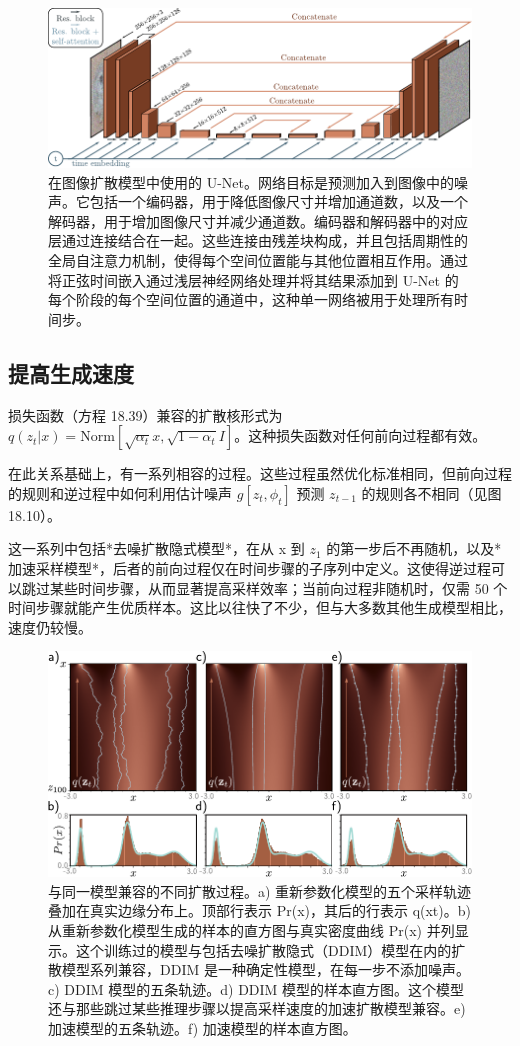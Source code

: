 \documentclass[lang=cn,newtx,10pt,scheme=chinese]{elegantbook}
\begin{document}
\begin{figure}[ht!]
\centering
\includegraphics[width=0.7\linewidth]{PDFFigures/UDLChap18PDF/DiffusionUNet.pdf}
\caption{在图像扩散模型中使用的 U-Net。网络目标是预测加入到图像中的噪声。它包括一个编码器，用于降低图像尺寸并增加通道数，以及一个解码器，用于增加图像尺寸并减少通道数。编码器和解码器中的对应层通过连接结合在一起。这些连接由残差块构成，并且包括周期性的全局自注意力机制，使得每个空间位置能与其他位置相互作用。通过将正弦时间嵌入通过浅层神经网络处理并将其结果添加到 U-Net 的每个阶段的每个空间位置的通道中，这种单一网络被用于处理所有时间步。}
\end{figure}


\subsection{提高生成速度}
损失函数（方程 18.39）兼容的扩散核形式为 \(q(z_t|x) = \text{Norm}[ \sqrt{\alpha_t}x, \sqrt{1 - \alpha_t} I ]\)。这种损失函数对任何前向过程都有效。

在此关系基础上，有一系列相容的过程。这些过程虽然优化标准相同，但前向过程的规则和逆过程中如何利用估计噪声 \( g[z_t, \phi_t] \) 预测 \(z_{t-1}\) 的规则各不相同（见图 18.10）。

这一系列中包括*去噪扩散隐式模型*，在从 x 到 \(z_1\) 的第一步后不再随机，以及*加速采样模型*，后者的前向过程仅在时间步骤的子序列中定义。这使得逆过程可以跳过某些时间步骤，从而显著提高采样效率；当前向过程非随机时，仅需 50 个时间步骤就能产生优质样本。这比以往快了不少，但与大多数其他生成模型相比，速度仍较慢。

\begin{figure}[ht!]
\centering
\includegraphics[width=0.7\linewidth]{PDFFigures/UDLChap18PDF/DiffusionImplicit.pdf}
\caption{与同一模型兼容的不同扩散过程。a) 重新参数化模型的五个采样轨迹叠加在真实边缘分布上。顶部行表示 Pr(x)，其后的行表示 q(xt)。b) 从重新参数化模型生成的样本的直方图与真实密度曲线 Pr(x) 并列显示。这个训练过的模型与包括去噪扩散隐式（DDIM）模型在内的扩散模型系列兼容，DDIM 是一种确定性模型，在每一步不添加噪声。c) DDIM 模型的五条轨迹。d) DDIM 模型的样本直方图。这个模型还与那些跳过某些推理步骤以提高采样速度的加速扩散模型兼容。e) 加速模型的五条轨迹。f) 加速模型的样本直方图。}
\end{figure}
\end{document}
